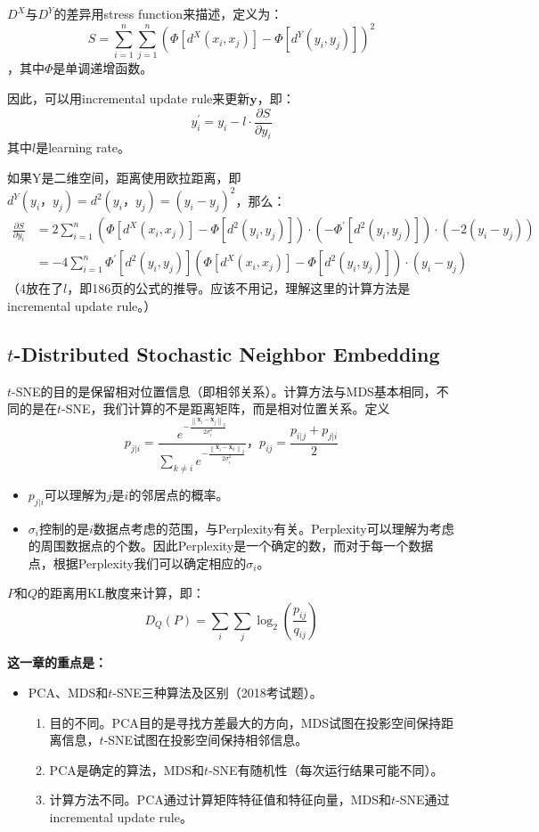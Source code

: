 \documentclass[12pt, a4paper, oneside]{ctexart}
\newenvironment{zd}{\begin{shaded}\par\noindent\textbf{这一章的重点是：}}{\end{shaded}\par}
\begin{document}
$D^X$与$D^Y$的差异用stress function来描述，定义为：$$S=\sum_{i=1}^n\sum_{j=1}^n{(\Phi [d^X(x_i,x_j)]-\Phi[d^Y(y_i,y_j)])}^2$$，其中$\Phi$是单调递增函数。

因此，可以用incremental update rule来更新$\mathbf{y}$，即：$$y_i^\prime=y_i-l\cdot \frac{\partial S}{\partial y_i}$$其中$l$是learning rate。

如果Y是二维空间，距离使用欧拉距离，即$d^Y(y_i，y_j)=d^2(y_i，y_j)={(y_i-y_j)}^2$，那么：$$\begin{aligned}\frac{\partial S}{\partial y_i}&=2\sum_{i=1}^n{(\Phi [d^X(x_i,x_j)]-\Phi[d^2(y_i,y_j)])}\cdot(-\Phi^\prime[d^2(y_i,y_j)])\cdot(-2(y_i-y_j))\\&=-4\sum_{i=1}^n\Phi^\prime[d^2(y_i,y_j)]{(\Phi [d^X(x_i,x_j)]-\Phi[d^2(y_i,y_j)])}\cdot(y_i-y_j)\end{aligned}$$（4放在了$l$，即186页的公式的推导。应该不用记，理解这里的计算方法是incremental update rule。）
\subsection{$t$-Distributed Stochastic Neighbor Embedding}
$t$-SNE的目的是保留相对位置信息（即相邻关系）。计算方法与MDS基本相同，不同的是在$t$-SNE，我们计算的不是距离矩阵，而是相对位置关系。定义$$p_{j|i}=\frac{e^{-{\frac{\left\|\mathbf{x}_i-\mathbf{x}_j\right\|_2}{2\sigma_i^2}}}}{\sum_{k\neq i}e^{-{\frac{\left\|\mathbf{x}_i-\mathbf{x}_k\right\|_2}{2\sigma_i^2}}}}\text{，} p_{ij}=\frac{p_{i|j}+p_{j|i}}{2}$$ 
\begin{itemize}
    \item $p_{j|i}$可以理解为$j$是$i$的邻居点的概率。
    \item $\sigma_i$控制的是$i$数据点考虑的范围，与Perplexity有关。Perplexity可以理解为考虑的周围数据点的个数。因此Perplexity是一个确定的数，而对于每一个数据点，根据Perplexity我们可以确定相应的$\sigma_i$。
\end{itemize}
$P$和$Q$的距离用KL散度来计算，即：$$D_Q(P)=\sum_i\sum_j\log_2(\frac{p_{ij}}{q_{ij}})$$
\begin{zd}
    \begin{itemize}
        \item PCA、MDS和$t$-SNE三种算法及区别（2018考试题）。
        \begin{enumerate}
            \item 目的不同。PCA目的是寻找方差最大的方向，MDS试图在投影空间保持距离信息，$t$-SNE试图在投影空间保持相邻信息。
            \item PCA是确定的算法，MDS和$t$-SNE有随机性（每次运行结果可能不同）。
            \item 计算方法不同。PCA通过计算矩阵特征值和特征向量，MDS和$t$-SNE通过incremental update rule。
        \end{enumerate}
    \end{itemize}
\end{zd}
\end{document}
